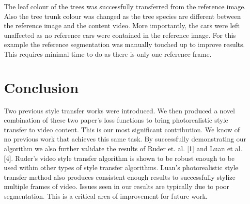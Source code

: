 \documentclass[runningheads]{llncs}
\begin{document}
The leaf colour of the trees was successfully transferred from the reference image. Also the tree trunk colour was changed as the tree species are different between the reference image and the content video. More importantly, the cars were left unaffected as no reference cars were contained in the reference image. For this example the reference segmentation was manually touched up to improve results. This requires minimal time to do as there is only one reference frame.


\section{Conclusion}
\vspace{-0.2cm}
Two previous style transfer works were introduced. We then produced a novel combination of these two paper's loss functions to bring photorealistic style transfer to video content. This is our most significant contribution. We know of no previous work that achieves this same task. By successfully demonstrating our algorithm we also further validate the results of Ruder et. al. [1] and Luan et al. [4]. Ruder's video style transfer algorithm is shown to be robust enough to be used within other types of style transfer algorithms. Luan's photorealistic style transfer method also produces consistent enough results to successfully stylize multiple frames of video. Issues seen in our results are typically due to poor segmentation. This is a critical area of improvement for future work.
\end{document}
